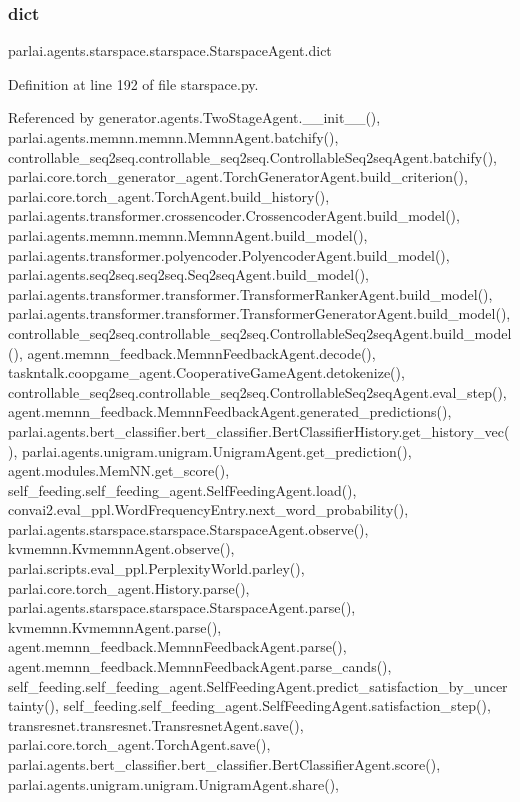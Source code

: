 \subsubsection{\texorpdfstring{dict}{dict}}
{\footnotesize\ttfamily parlai.\+agents.\+starspace.\+starspace.\+Starspace\+Agent.\+dict}



Definition at line 192 of file starspace.\+py.



Referenced by generator.\+agents.\+Two\+Stage\+Agent.\+\_\+\+\_\+init\+\_\+\+\_\+(), parlai.\+agents.\+memnn.\+memnn.\+Memnn\+Agent.\+batchify(), controllable\+\_\+seq2seq.\+controllable\+\_\+seq2seq.\+Controllable\+Seq2seq\+Agent.\+batchify(), parlai.\+core.\+torch\+\_\+generator\+\_\+agent.\+Torch\+Generator\+Agent.\+build\+\_\+criterion(), parlai.\+core.\+torch\+\_\+agent.\+Torch\+Agent.\+build\+\_\+history(), parlai.\+agents.\+transformer.\+crossencoder.\+Crossencoder\+Agent.\+build\+\_\+model(), parlai.\+agents.\+memnn.\+memnn.\+Memnn\+Agent.\+build\+\_\+model(), parlai.\+agents.\+transformer.\+polyencoder.\+Polyencoder\+Agent.\+build\+\_\+model(), parlai.\+agents.\+seq2seq.\+seq2seq.\+Seq2seq\+Agent.\+build\+\_\+model(), parlai.\+agents.\+transformer.\+transformer.\+Transformer\+Ranker\+Agent.\+build\+\_\+model(), parlai.\+agents.\+transformer.\+transformer.\+Transformer\+Generator\+Agent.\+build\+\_\+model(), controllable\+\_\+seq2seq.\+controllable\+\_\+seq2seq.\+Controllable\+Seq2seq\+Agent.\+build\+\_\+model(), agent.\+memnn\+\_\+feedback.\+Memnn\+Feedback\+Agent.\+decode(), taskntalk.\+coopgame\+\_\+agent.\+Cooperative\+Game\+Agent.\+detokenize(), controllable\+\_\+seq2seq.\+controllable\+\_\+seq2seq.\+Controllable\+Seq2seq\+Agent.\+eval\+\_\+step(), agent.\+memnn\+\_\+feedback.\+Memnn\+Feedback\+Agent.\+generated\+\_\+predictions(), parlai.\+agents.\+bert\+\_\+classifier.\+bert\+\_\+classifier.\+Bert\+Classifier\+History.\+get\+\_\+history\+\_\+vec(), parlai.\+agents.\+unigram.\+unigram.\+Unigram\+Agent.\+get\+\_\+prediction(), agent.\+modules.\+Mem\+N\+N.\+get\+\_\+score(), self\+\_\+feeding.\+self\+\_\+feeding\+\_\+agent.\+Self\+Feeding\+Agent.\+load(), convai2.\+eval\+\_\+ppl.\+Word\+Frequency\+Entry.\+next\+\_\+word\+\_\+probability(), parlai.\+agents.\+starspace.\+starspace.\+Starspace\+Agent.\+observe(), kvmemnn.\+Kvmemnn\+Agent.\+observe(), parlai.\+scripts.\+eval\+\_\+ppl.\+Perplexity\+World.\+parley(), parlai.\+core.\+torch\+\_\+agent.\+History.\+parse(), parlai.\+agents.\+starspace.\+starspace.\+Starspace\+Agent.\+parse(), kvmemnn.\+Kvmemnn\+Agent.\+parse(), agent.\+memnn\+\_\+feedback.\+Memnn\+Feedback\+Agent.\+parse(), agent.\+memnn\+\_\+feedback.\+Memnn\+Feedback\+Agent.\+parse\+\_\+cands(), self\+\_\+feeding.\+self\+\_\+feeding\+\_\+agent.\+Self\+Feeding\+Agent.\+predict\+\_\+satisfaction\+\_\+by\+\_\+uncertainty(), self\+\_\+feeding.\+self\+\_\+feeding\+\_\+agent.\+Self\+Feeding\+Agent.\+satisfaction\+\_\+step(), transresnet.\+transresnet.\+Transresnet\+Agent.\+save(), parlai.\+core.\+torch\+\_\+agent.\+Torch\+Agent.\+save(), parlai.\+agents.\+bert\+\_\+classifier.\+bert\+\_\+classifier.\+Bert\+Classifier\+Agent.\+score(), parlai.\+agents.\+unigram.\+unigram.\+Unigram\+Agent.\+share(), 